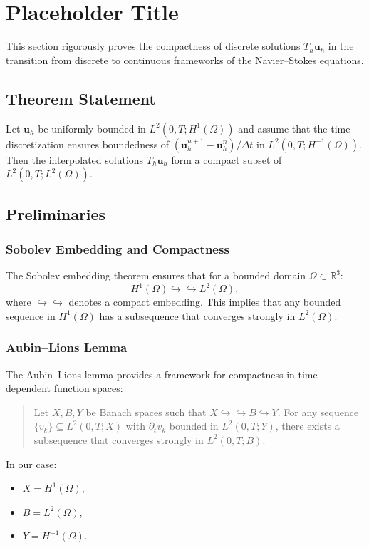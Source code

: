 \section{Placeholder Title}

This section rigorously proves the compactness of discrete solutions $T_h \mathbf{u}_h$ in the transition from discrete to continuous frameworks of the Navier--Stokes equations.

\subsection{Theorem Statement}

\begin{theorem}[Compactness]
Let $\mathbf{u}_h$ be uniformly bounded in $L^2(0,T; H^1(\Omega))$ and assume that the time discretization ensures boundedness of $(\mathbf{u}_h^{n+1} - \mathbf{u}_h^n)/\Delta t$ in $L^2(0,T; H^{-1}(\Omega))$. Then the interpolated solutions $T_h \mathbf{u}_h$ form a compact subset of $L^2(0,T; L^2(\Omega))$.
\end{theorem}

\subsection{Preliminaries}

\subsubsection{Sobolev Embedding and Compactness}
The Sobolev embedding theorem ensures that for a bounded domain $\Omega \subset \mathbb{R}^3$:
\begin{equation}
H^1(\Omega) \hookrightarrow\hookrightarrow L^2(\Omega),
\end{equation}
where $\hookrightarrow\hookrightarrow$ denotes a compact embedding. This implies that any bounded sequence in $H^1(\Omega)$ has a subsequence that converges strongly in $L^2(\Omega)$.

\subsubsection{Aubin--Lions Lemma}
The Aubin--Lions lemma provides a framework for compactness in time-dependent function spaces:
\begin{quote}
Let $X, B, Y$ be Banach spaces such that $X \hookrightarrow\hookrightarrow B \hookrightarrow Y$. For any sequence $\{v_k\} \subseteq L^2(0,T; X)$ with $\partial_t v_k$ bounded in $L^2(0,T; Y)$, there exists a subsequence that converges strongly in $L^2(0,T; B)$.
\end{quote}
In our case:
\begin{itemize}
    \item $X = H^1(\Omega)$,
    \item $B = L^2(\Omega)$,
    \item $Y = H^{-1}(\Omega)$.
\end{itemize}

